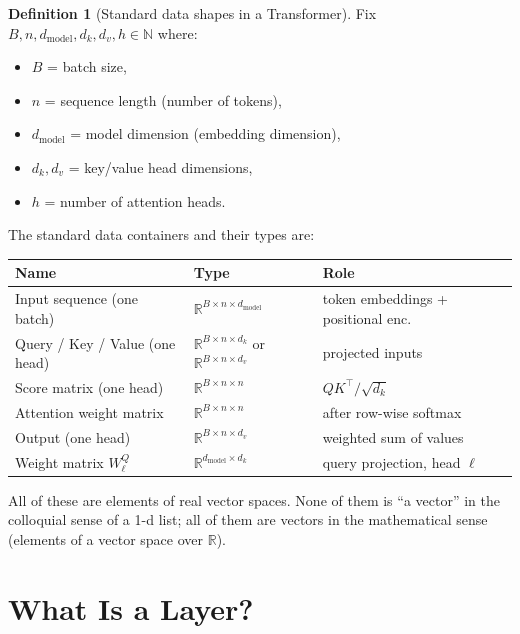 \documentclass[11pt]{amsart}
\theoremstyle{plain}
\theoremstyle{definition}
\newtheorem{definition}[theorem]{Definition}
\begin{document}
\begin{definition}[Standard data shapes in a Transformer]
\label{def:shapes}
Fix $B, n, d_{\mathrm{model}}, d_k, d_v, h \in \mathbb{N}$ where:
\begin{itemize}
    \item $B$ = batch size,
    \item $n$ = sequence length (number of tokens),
    \item $d_{\mathrm{model}}$ = model dimension (embedding dimension),
    \item $d_k, d_v$ = key/value head dimensions,
    \item $h$ = number of attention heads.
\end{itemize}
The standard data containers and their types are:
\begin{center}
\renewcommand{\arraystretch}{1.3}
\begin{tabular}{lll}
\hline
Name & Type & Role \\
\hline
Input sequence (one batch) & $\mathbb{R}^{B \times n \times d_{\mathrm{model}}}$ & token embeddings + positional enc. \\
Query / Key / Value (one head) & $\mathbb{R}^{B \times n \times d_k}$ or $\mathbb{R}^{B \times n \times d_v}$ & projected inputs \\
Score matrix (one head) & $\mathbb{R}^{B \times n \times n}$ & $QK^\top/\sqrt{d_k}$ \\
Attention weight matrix & $\mathbb{R}^{B \times n \times n}$ & after row-wise softmax \\
Output (one head) & $\mathbb{R}^{B \times n \times d_v}$ & weighted sum of values \\
Weight matrix $W^Q_\ell$ & $\mathbb{R}^{d_{\mathrm{model}} \times d_k}$ & query projection, head $\ell$ \\
\hline
\end{tabular}
\end{center}
All of these are elements of real vector spaces.  None of them is ``a vector''
in the colloquial sense of a 1-d list; all of them are vectors in the
mathematical sense (elements of a vector space over $\mathbb{R}$).
\end{definition}

\section{What Is a Layer?}
\label{sec:layer}
\end{document}

